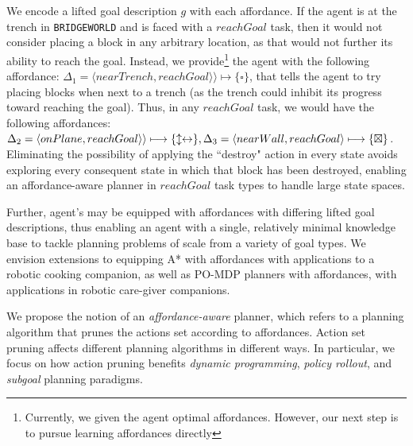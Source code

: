 \documentclass[]{article}
\begin{document}
We encode a lifted goal description $g$ with each affordance. 
If the agent is at the trench in \texttt{BRIDGEWORLD}
and is faced with a $reachGoal$ task, then it would not consider placing a block
in any arbitrary location, as that would not further its ability to reach the goal. Instead, we provide\footnote{Currently, we given the agent optimal affordances. However, our next step is to pursue learning affordances directly}
the agent with the following affordance: $\Delta_1 = \langle nearTrench, reachGoal \rangle \rangle \longmapsto \{\square\}$,
that tells the agent to try placing blocks when next to a trench
(as the trench could inhibit its progress toward reaching the goal). Thus, in any $reachGoal$
task, we would have the following affordances: $\Delta_2 = \langle onPlane, reachGoal \rangle \rangle \longmapsto \{\updownarrow \leftrightarrow\}, \\ \Delta_3 = \langle nearWall, reachGoal \rangle \longmapsto \{\boxtimes \}$.
Eliminating the possibility of applying the ``destroy" action in every state 
avoids exploring every consequent state in which that block has
been destroyed, enabling an affordance-aware planner in $reachGoal$ task
types to handle large state spaces.

Further, agent's may be equipped with affordances with differing lifted
goal descriptions, thus enabling an agent with a single, relatively minimal
knowledge base to tackle planning problems of scale from a variety of goal types.
We envision extensions to equipping A* with affordances with applications
to a robotic cooking companion, as well as PO-MDP planners with affordances, with
applications in robotic care-giver companions.

We propose the notion of an {\it affordance-aware} planner, which refers to
a planning algorithm that prunes the actions set according to affordances.
Action set pruning affects different planning algorithms in
different ways. In particular, we focus on how action pruning benefits
{\em dynamic programming}, {\em policy rollout}, and {\em subgoal} planning paradigms.
\end{document}
